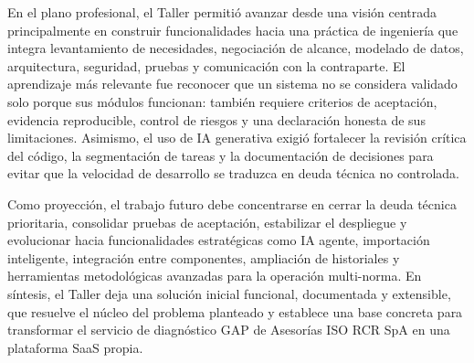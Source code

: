 \documentclass[final]{udpthesis}
\begin{document}
En el plano profesional, el Taller permitió avanzar desde una visión centrada principalmente en construir funcionalidades hacia una práctica de ingeniería que integra levantamiento de necesidades, negociación de alcance, modelado de datos, arquitectura, seguridad, pruebas y comunicación con la contraparte. El aprendizaje más relevante fue reconocer que un sistema no se considera validado solo porque sus módulos funcionan: también requiere criterios de aceptación, evidencia reproducible, control de riesgos y una declaración honesta de sus limitaciones. Asimismo, el uso de IA generativa exigió fortalecer la revisión crítica del código, la segmentación de tareas y la documentación de decisiones para evitar que la velocidad de desarrollo se traduzca en deuda técnica no controlada.

Como proyección, el trabajo futuro debe concentrarse en cerrar la deuda técnica prioritaria, consolidar pruebas de aceptación, estabilizar el despliegue y evolucionar hacia funcionalidades estratégicas como IA agente, importación inteligente, integración entre componentes, ampliación de historiales y herramientas metodológicas avanzadas para la operación multi-norma. En síntesis, el Taller deja una solución inicial funcional, documentada y extensible, que resuelve el núcleo del problema planteado y establece una base concreta para transformar el servicio de diagnóstico GAP de Asesorías ISO RCR SpA en una plataforma SaaS propia.

\backmatter
\end{document}
